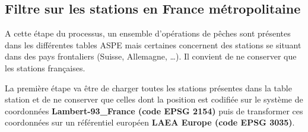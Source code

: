 \documentclass[]{template/RapportPole}
\begin{document}
\newpage

\hypertarget{filtre-sur-les-stations-en-france-muxe9tropolitaine}{%
\subsection{Filtre sur les stations en France métropolitaine}\label{filtre-sur-les-stations-en-france-muxe9tropolitaine}}

A cette étape du processus, un ensemble d'opérations de pêches sont présentes dans les différentes tables ASPE mais certaines concernent des stations se situant dans des pays frontaliers (Suisse, Allemagne, \ldots). Il convient de ne conserver que les stations françaises.

La première étape va être de charger toutes les stations présentes dans la table station et de ne conserver que celles dont la position est codifiée sur le système de coordonnées \textbf{Lambert-93\_France (code EPSG 2154)} puis de transformer ces coordonnées sur un référentiel européen \textbf{LAEA Europe (code EPSG 3035)}.
\end{document}
